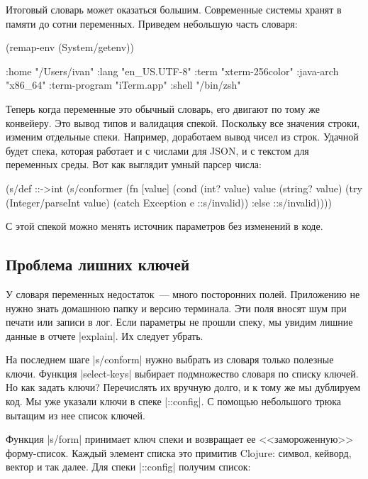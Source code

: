 Итоговый словарь может оказаться большим. Современные системы хранят в памяти до
сотни переменных. Приведем небольшую часть словаря:

\begin{english}
  \begin{clojure}
(remap-env (System/getenv))

{:home "/Users/ivan"
 :lang "en_US.UTF-8"
 :term "xterm-256color"
 :java-arch "x86_64"
 :term-program "iTerm.app"
 :shell "/bin/zsh"}
  \end{clojure}
\end{english}

Теперь когда переменные это обычный словарь, его двигают по тому же
конвейеру. Это вывод типов и валидация спекой. Поскольку все значения строки,
изменим отдельные спеки. Например, доработаем вывод чисел из строк. Удачной
будет спека, которая работает и с числами для JSON, и с текстом для переменных
среды. Вот как выглядит умный парсер числа:

\begin{english}
  \begin{clojure}
(s/def ::->int
  (s/conformer
   (fn [value]
     (cond
       (int? value) value
       (string? value)
       (try (Integer/parseInt value)
            (catch Exception e
              ::s/invalid))
       :else ::s/invalid))))
  \end{clojure}
\end{english}

С этой спекой можно менять источник параметров без изменений в коде.

\subsection{Проблема лишних ключей}

У словаря переменных недостаток~--- много посторонних полей. Приложению не нужно
знать домашнюю папку и версию терминала. Эти поля вносят шум при печати или
записи в лог. Если параметры не прошли спеку, мы увидим лишние данные в отчете
\spverb|explain|. Их следует убрать.

На последнем шаге \spverb|s/conform| нужно выбрать из словаря только полезные
ключи. Функция \spverb|select-keys| выбирает подмножество словаря по списку
ключей. Но как задать ключи? Перечислять их вручную долго, и к тому же мы
дублируем код. Мы уже указали ключи в спеке \spverb|::config|. С помощью
небольшого трюка вытащим из нее список ключей.

Функция \spverb|s/form| принимает ключ спеки и возвращает ее <<замороженную>>
форму-список. Каждый элемент списка это примитив Clojure: символ, кейворд,
вектор и так далее. Для спеки \spverb|::config| получим список:

